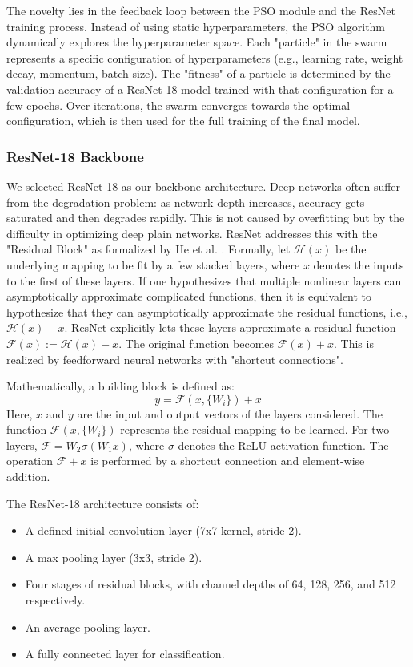 \documentclass[12pt, a4paper]{article}
\begin{document}
The novelty lies in the feedback loop between the PSO module and the ResNet training process. Instead of using static hyperparameters, the PSO algorithm dynamically explores the hyperparameter space. Each "particle" in the swarm represents a specific configuration of hyperparameters (e.g., learning rate, weight decay, momentum, batch size). The "fitness" of a particle is determined by the validation accuracy of a ResNet-18 model trained with that configuration for a few epochs. Over iterations, the swarm converges towards the optimal configuration, which is then used for the full training of the final model.

\subsubsection{ResNet-18 Backbone}
We selected ResNet-18 as our backbone architecture. Deep networks often suffer from the degradation problem: as network depth increases, accuracy gets saturated and then degrades rapidly. This is not caused by overfitting but by the difficulty in optimizing deep plain networks.
ResNet addresses this with the "Residual Block" as formalized by He et al. \cite{r4}. Formally, let $\mathcal{H}(x)$ be the underlying mapping to be fit by a few stacked layers, where $x$ denotes the inputs to the first of these layers. If one hypothesizes that multiple nonlinear layers can asymptotically approximate complicated functions, then it is equivalent to hypothesize that they can asymptotically approximate the residual functions, i.e., $\mathcal{H}(x) - x$.
ResNet explicitly lets these layers approximate a residual function $\mathcal{F}(x) := \mathcal{H}(x) - x$. The original function becomes $\mathcal{F}(x) + x$. This is realized by feedforward neural networks with "shortcut connections".

Mathematically, a building block is defined as:
\begin{equation}
y = \mathcal{F}(x, \{W_i\}) + x
\end{equation}
Here, $x$ and $y$ are the input and output vectors of the layers considered. The function $\mathcal{F}(x, \{W_i\})$ represents the residual mapping to be learned. For two layers, $\mathcal{F} = W_2 \sigma(W_1 x)$, where $\sigma$ denotes the ReLU activation function. The operation $\mathcal{F} + x$ is performed by a shortcut connection and element-wise addition.

The ResNet-18 architecture consists of:
\begin{itemize}
    \item A defined initial convolution layer (7x7 kernel, stride 2).
    \item A max pooling layer (3x3, stride 2).
    \item Four stages of residual blocks, with channel depths of 64, 128, 256, and 512 respectively.
    \item An average pooling layer.
    \item A fully connected layer for classification.
\end{itemize}
\end{document}

